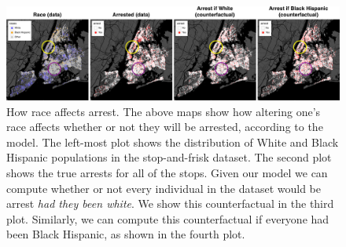 
\begin{figure}[!t]
\begin{center}
\centerline{\includegraphics[width=\textwidth]{stopandfrisk_counterfactual_graphs_trim.png}}
\caption{How race affects arrest. The above maps show how altering one's race affects whether or not they will be arrested, according to the model. The left-most plot shows the distribution of White and Black Hispanic populations in the stop-and-frisk dataset. The second plot shows the true arrests for all of the stops. Given our model we can compute whether or not every individual in the dataset would be arrest \emph{had they been white}. We show this counterfactual in the third plot. Similarly, we can compute this counterfactual if everyone had been Black Hispanic, as shown in the fourth plot.}
\label{figure.criminality2}
\end{center}
\end{figure}

